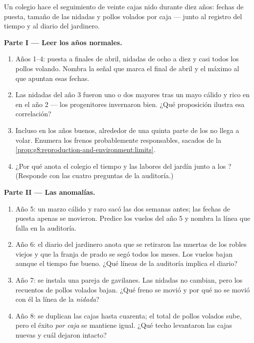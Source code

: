 \begin{problem}\label{pb:g8:reproduction-and-environment:1}
Un colegio hace el seguimiento de veinte cajas nido durante diez años:
fechas de puesta, tamaño de las nidadas y pollos volados por caja ---
junto al registro del tiempo y al diario del jardinero.

\medskip\noindent\textbf{Parte I --- Leer los años normales.}
\begin{enumerate}
  \item Años 1--4: puesta a finales de abril, nidadas de ocho a diez
         y casi todos los pollos volando. Nombra la señal que
        marca el final de abril y el máximo al que apuntan esas fechas.
  \item Las nidadas del año 3 fueron uno o dos  mayores tras un
        mayo cálido y rico en  en el año 2 --- los progenitores
        invernaron bien. ¿Qué proposición ilustra esa correlación?
  \item Incluso en los años buenos, alrededor de una quinta parte de
        los  no llega a volar. Enumera los frenos probablemente
        responsables, sacados de la
        \cref{prop:g8:reproduction-and-environment:limits}.
  \item ¿Por qué anota el colegio el tiempo y las labores del jardín
        junto a los ? (Responde con las cuatro preguntas de la
        auditoría.)
\end{enumerate}

\medskip\noindent\textbf{Parte II --- Las anomalías.}
\begin{enumerate}[resume]
  \item Año 5: un marzo cálido y raro sacó las  dos semanas
        antes; las fechas de puesta apenas se movieron. Predice los
        vuelos del año 5 y nombra la línea que falla en la auditoría.
  \item Año 6: el diario del jardinero anota que se retiraron las 
        muertas de los robles viejos y que la franja de prado se segó
        todos los meses. Los vuelos bajan aunque el tiempo fue bueno.
        ¿Qué líneas de la auditoría implica el diario?
  \item Año 7: se instala una pareja de gavilanes. Las nidadas no
        cambian, pero los recuentos de pollos volados bajan. ¿Qué freno
        se movió y por qué no se movió con él la línea de la
        \emph{nidada}?
  \item Año 8: se duplican las cajas hasta cuarenta; el total de pollos
        volados sube, pero el éxito \emph{por caja} se mantiene igual.
        ¿Qué techo levantaron las cajas nuevas y cuál dejaron intacto?
\end{enumerate}


\end{problem}
